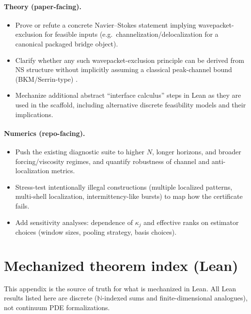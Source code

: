 \documentclass[11pt]{article}
\begin{document}
\paragraph{Theory (paper-facing).}
\begin{itemize}
\item Prove or refute a concrete Navier--Stokes statement implying wavepacket-exclusion for feasible inputs
(e.g.\ channelization/delocalization for a canonical packaged bridge object).
\item Clarify whether any such wavepacket-exclusion principle can be derived from NS structure without implicitly
assuming a classical peak-channel bound (BKM/Serrin-type) \citep{bkm_1984,serrin1962interior}.
\item Mechanize additional abstract ``interface calculus'' steps in Lean as they are used in the scaffold,
including alternative discrete feasibility models and their implications.
\end{itemize}

\paragraph{Numerics (repo-facing).}
\begin{itemize}
\item Push the existing diagnostic suite to higher $N$, longer horizons, and broader forcing/viscosity regimes,
and quantify robustness of channel and anti-localization metrics.
\item Stress-test intentionally illegal constructions (multiple localized patterns, multi-shell localization,
intermittency-like bursts) to map how the certificate fails.
\item Add sensitivity analyses: dependence of $\kappa_j$ and effective ranks on estimator choices (window sizes,
pooling strategy, basis choices).
\end{itemize}
 
\appendix
\clearpage
\section{Mechanized theorem index (Lean)}\label{app:theorem-index}

This appendix is the source of truth for what is mechanized in Lean.
All Lean results listed here are discrete (\(\mathbb{N}\)-indexed sums and finite-dimensional analogues), not continuum PDE formalizations.
\end{document}
